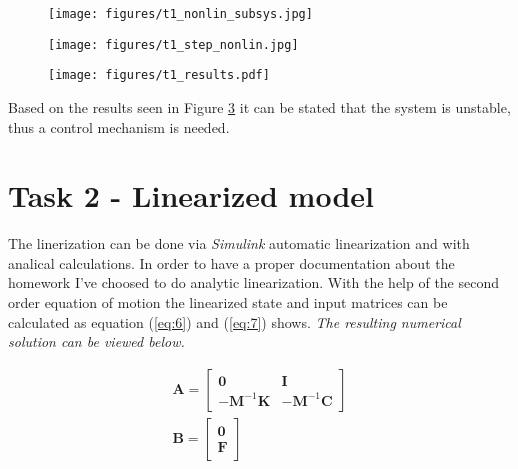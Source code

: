 \documentclass[12pt]{article}
\begin{document}
\begin{figure}[ht!]
  \begin{center}
  \texttt{[image: figures/t1\_nonlin\_subsys.jpg]}
  \label{fig:plot1}
  \end{center}
\end{figure}

\begin{figure}[ht!]
  \begin{center}
  \texttt{[image: figures/t1\_step\_nonlin.jpg]}
  \label{fig:plot2}
  \end{center}
\end{figure}

\newpage
 
\begin{figure}[ht!]
  \begin{center}
  \texttt{[image: figures/t1\_results.pdf]}
  \label{fig:plot3}
  \end{center}
\end{figure}

\noindent Based on the results seen in Figure \ref{fig:plot3} it can be stated that the system is unstable, thus a control mechanism is needed.
\newpage

\section*{Task 2 - Linearized model}
The linerization can be done via \textit{Simulink} automatic linearization and with analical calculations. In order to have a proper documentation about the homework I've choosed to do analytic linearization. With the help of the second order equation of motion the linearized state and input matrices can be calculated as equation (\ref{eq:6}) and (\ref{eq:7}) shows. \textit{The resulting numerical solution can be viewed below.}

\begin{gather}
  \label{eq:6}
  \mathbf{A} = \begin{bmatrix}
    \mathbf{0} & \mathbf{I} \\
    -\mathbf{M}^{-1} \mathbf{K} & -\mathbf{M}^{-1} \mathbf{C}      
  \end{bmatrix} \\
  \label{eq:7}
  \mathbf{B} = \begin{bmatrix}
    \mathbf{0} \\
    \mathbf{F}  
  \end{bmatrix} 
\end{gather}
\end{document}
